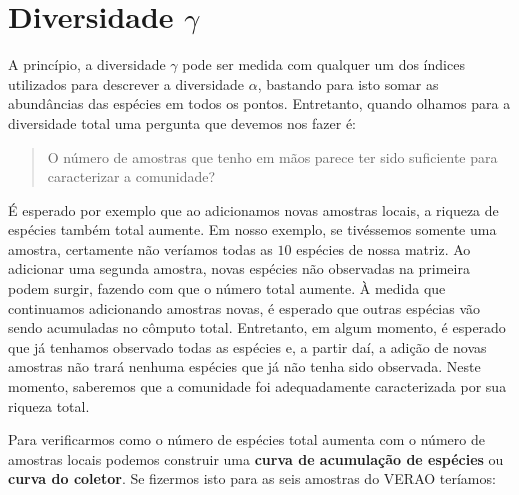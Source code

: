 \documentclass[
]{book}
\begin{document}
\hypertarget{diversidade-gamma}{%
\section{\texorpdfstring{Diversidade \(\gamma\)}{Diversidade \textbackslash gamma}}\label{diversidade-gamma}}

A princípio, a diversidade \(\gamma\) pode ser medida com qualquer um dos índices utilizados para descrever a diversidade \(\alpha\), bastando para isto somar as abundâncias das espécies em todos os pontos. Entretanto, quando olhamos para a diversidade total uma pergunta que devemos nos fazer é:

\begin{quote}
O número de amostras que tenho em mãos parece ter sido suficiente para caracterizar a comunidade?
\end{quote}

É esperado por exemplo que ao adicionamos novas amostras locais, a riqueza de espécies também total aumente. Em nosso exemplo, se tivéssemos somente uma amostra, certamente não veríamos todas as \(10\) espécies de nossa matriz. Ao adicionar uma segunda amostra, novas espécies não observadas na primeira podem surgir, fazendo com que o número total aumente. À medida que continuamos adicionando amostras novas, é esperado que outras espécias vão sendo acumuladas no cômputo total. Entretanto, em algum momento, é esperado que já tenhamos observado todas as espécies e, a partir daí, a adição de novas amostras não trará nenhuma espécies que já não tenha sido observada. Neste momento, saberemos que a comunidade foi adequadamente caracterizada por sua riqueza total.

Para verificarmos como o número de espécies total aumenta com o número de amostras locais podemos construir uma \textbf{curva de acumulação de espécies} ou \textbf{curva do coletor}. Se fizermos isto para as seis amostras do VERAO teríamos:
\end{document}

